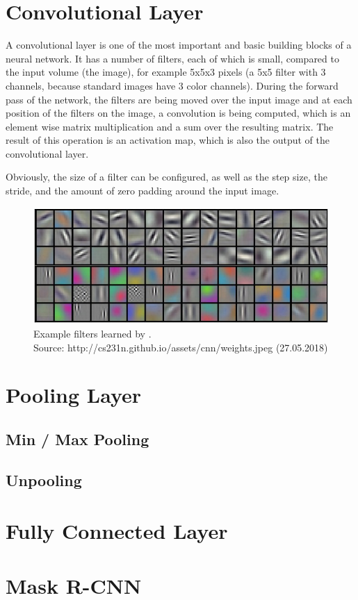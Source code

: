 \section{Convolutional Layer}
A convolutional layer is one of the most important and basic building blocks of a neural network. It has a number of filters, each of which is small, compared to the input volume (the image), for example 5x5x3 pixels (a 5x5 filter with 3 channels, because standard images have 3 color channels). During the forward pass of the network, the filters are being moved over the input image and at each position of the filters on the image, a convolution is being computed, which is an element wise matrix multiplication and a sum over the resulting matrix. The result of this operation is an activation map, which is also the output of the convolutional layer.

Obviously, the size of a filter can be configured, as well as the step size, the stride, and the amount of zero padding around the input image.

\begin{figure}[H]
    \centering
	\includegraphics[width=0.6\linewidth]{chapters/neural_networks/images/example_filters.jpeg}
	\caption{Example filters learned by \cite{Krizhevsky.2012}.\\ Source: http://cs231n.github.io/assets/cnn/weights.jpeg (27.05.2018)}
	\label{fig:neural_networks:example_filters}
\end{figure}

\section{Pooling Layer}
\subsection{Min / Max Pooling}
\subsection{Unpooling}
\section{Fully Connected Layer}
\section{Mask R-CNN}

